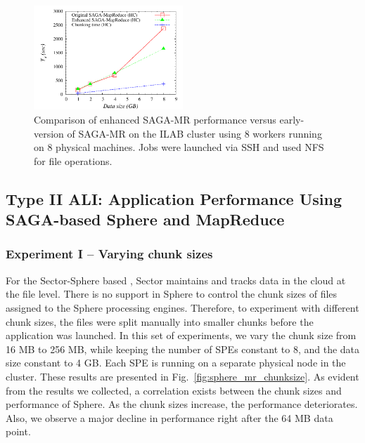 \documentclass[3p,twocolumn]{elsarticle}
\begin{document}
\begin{figure}[htb!]
 \includegraphics[width=0.5\textwidth]{figures/sagamr_comparison.pdf}
 \caption{
   Comparison of enhanced SAGA-MR performance versus
   early-version of SAGA-MR on the ILAB cluster using 8 workers running on 8
   physical machines. Jobs were launched via SSH and used NFS for file
   operations.
   \label{fig:sagamr_comparison}
   }
\end{figure}


\subsection{Type II ALI: Application Performance Using SAGA-based
Sphere and MapReduce}

\subsubsection{Experiment I -- Varying chunk sizes} 

For the Sector-Sphere based \wc, Sector maintains and tracks
data in the cloud at the file level. There is no support in Sphere to
control the chunk sizes of files assigned to the Sphere processing
engines. Therefore, to experiment with different chunk sizes, the
files were split manually into smaller chunks before the \wc
application was launched. In this set of experiments, we vary the
chunk size from 16 MB to 256 MB, while keeping the number of SPEs
constant to 8, and the data size constant to 4 GB. Each SPE is running
on a separate physical node in the cluster. These results are
presented in Fig.~\ref{fig:sphere_mr_chunksize}.
As evident from the results we collected, a
correlation exists between the chunk sizes and performance of Sphere.
As the chunk sizes increase, the performance deteriorates. Also, we
observe a major decline in performance right after the 64 MB data
point. 
\end{document}
